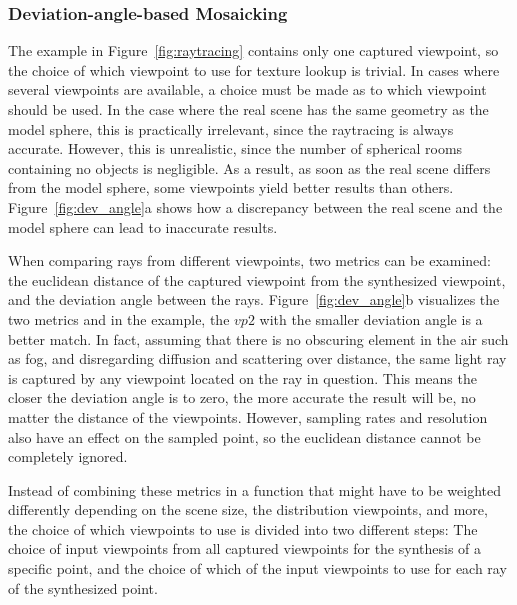 

\subsubsection{Deviation-angle-based Mosaicking}
The example in Figure~\ref{fig:raytracing} contains only one captured viewpoint, so the choice of which viewpoint to use for texture lookup is trivial. In cases where several viewpoints are available, a choice must be made as to which viewpoint should be used. In the case where the real scene has the same geometry as the model sphere, this is practically irrelevant, since the raytracing is always accurate. However, this is unrealistic, since the number of spherical rooms containing no objects is negligible. As a result, as soon as the real scene differs from the model sphere, some viewpoints yield better results than others. Figure~\ref{fig:dev_angle}a shows how a discrepancy between the real scene and the model sphere can lead to inaccurate results.

When comparing rays from different viewpoints, two metrics can be examined: the euclidean distance of the captured viewpoint from the synthesized viewpoint, and the deviation angle between the rays. Figure~\ref{fig:dev_angle}b visualizes the two metrics and in the example, the $vp2$ with the smaller deviation angle is a better match. In fact, assuming that there is no obscuring element in the air such as fog, and disregarding diffusion and scattering over distance, the same light ray is captured by any viewpoint located on the ray in question. This means the closer the deviation angle is to zero, the more accurate the result will be, no matter the distance of the viewpoints. However, sampling rates and resolution also have an effect on the sampled point, so the euclidean distance cannot be completely ignored. 

Instead of combining these metrics in a function that might have to be weighted differently depending on the scene size, the distribution viewpoints, and more, the choice of which viewpoints to use is divided into two different steps: The choice of input viewpoints from all captured viewpoints for the synthesis of a specific point, and the choice of which of the input viewpoints to use for each ray of the synthesized point. 

